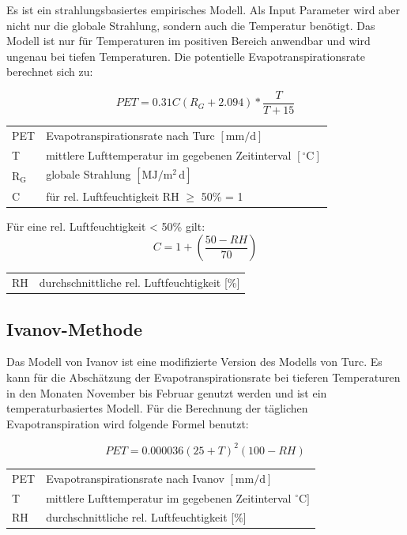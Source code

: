 Es ist ein strahlungsbasiertes empirisches Modell. Als Input Parameter wird aber nicht nur die globale Strahlung, sondern auch die Temperatur benötigt. Das Modell ist nur für Temperaturen im positiven Bereich anwendbar und wird ungenau bei tiefen Temperaturen. Die potentielle Evapotranspirationsrate berechnet sich zu:

\begin{equation}
\label{eq:turc}
PET=0.31C\left(R_G+2.094\right)*\frac{T}{T+15}
\end{equation}
\begin{table}[H]
\centering
\begin{tabular}{ll}
PET & Evapotranspirationsrate nach Turc  $\mathrm{[mm/d]}$\\
T & mittlere Lufttemperatur im gegebenen Zeitinterval $\mathrm{[^{\circ}C]}$\\
$\mathrm{R_G}$ & globale Strahlung $\mathrm{[MJ/m^2\,d]}$\\
C & für rel. Luftfeuchtigkeit RH $\geq$ 50\% = 1\\
\end{tabular}
\end{table}
Für eine rel. Luftfeuchtigkeit < 50\% gilt:
\begin{equation}
\label{eq:turc_c}
C=1+\left(\frac{50-RH}{70}\right)
\end{equation}
\begin{table}[H]
\centering
\begin{tabular}{ll}
RH& durchschnittliche rel. Luftfeuchtigkeit [\%]\\
\end{tabular}
\end{table}

\subsection{Ivanov-Methode}
Das Modell von Ivanov ist eine modifizierte Version des Modells von Turc. Es kann für die Abschätzung der Evapotranspirationsrate bei tieferen Temperaturen in den Monaten November bis Februar genutzt werden und ist ein temperaturbasiertes Modell. Für die Berechnung der täglichen Evapotranspiration wird folgende Formel benutzt:

\begin{equation}
\label{eq:ivanov_d}
PET=0.000036(25+T)^2(100-RH)
\end{equation}
\begin{table}[H]
\centering
\begin{tabular}{ll}
PET & Evapotranspirationsrate nach Ivanov  $\mathrm{[mm/d]}$\\
T & mittlere Lufttemperatur im gegebenen Zeitinterval $\mathrm{{^\circ}C]}$\\
RH& durchschnittliche rel. Luftfeuchtigkeit [\%]\\
\end{tabular}
\end{table}

